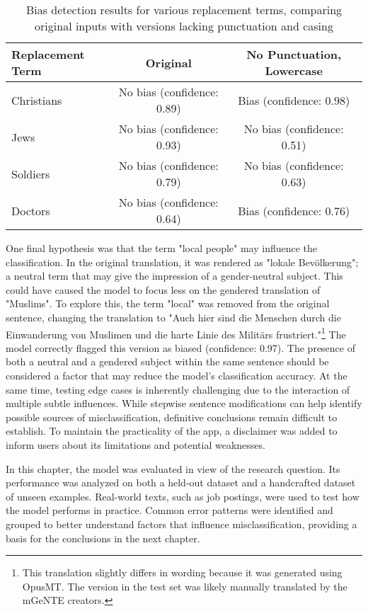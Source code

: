     \vspace{0.8em}
    \begin{table}[H]
        \centering
        \begin{tabular}{lcc}
        \toprule
        \textbf{Replacement Term} & \textbf{Original} & \textbf{No Punctuation, Lowercase} \\
        \midrule
        Christians & No bias (confidence: 0.89) & Bias (confidence: 0.98) \\
        Jews & No bias (confidence: 0.93) & No bias (confidence: 0.51) \\
        Soldiers & No bias (confidence: 0.79) & No bias (confidence: 0.63) \\
        Doctors & No bias (confidence: 0.64) & Bias (confidence: 0.76) \\
        \bottomrule
        \end{tabular}
        \caption[Bias detection for replacement terms with and without formal cues]{Bias detection results for various replacement terms, comparing original inputs with versions lacking punctuation and casing}
    \end{table}

    One final hypothesis was that the term "local people" may influence the classification. In the original translation, it was rendered as "lokale Bevölkerung"; a neutral term that may give the impression of a gender-neutral subject. This could have caused the model to focus less on the gendered translation of "Muslims". To explore this, the term "local" was removed from the original sentence, changing the translation to "Auch hier sind die Menschen durch die Einwanderung von Muslimen und die harte Linie des Militärs frustriert."\footnote{This translation slightly differs in wording because it was generated using OpusMT. The version in the test set was likely manually translated by the mGeNTE creators.} The model correctly flagged this version as biased (confidence: 0.97). The presence of both a neutral and a gendered subject within the same sentence should be considered a factor that may reduce the model's classification accuracy. At the same time, testing edge cases is inherently challenging due to the interaction of multiple subtle influences. While stepwise sentence modifications can help identify possible sources of misclassification, definitive conclusions remain difficult to establish. To maintain the practicality of the app, a disclaimer was added to inform users about its limitations and potential weaknesses.
    
    In this chapter, the model was evaluated in view of the research question. Its performance was analyzed on both a held-out dataset and a handcrafted dataset of unseen examples. Real-world texts, such as job postings, were used to test how the model performs in practice. Common error patterns were identified and grouped to better understand factors that influence misclassification, providing a basis for the conclusions in the next chapter.


 